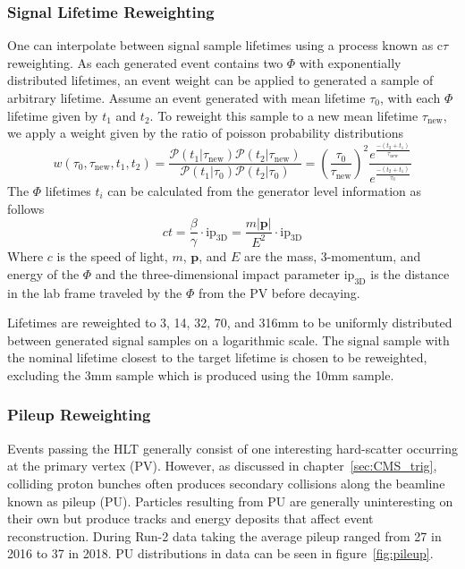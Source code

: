 \subsubsection{Signal Lifetime Reweighting} \label{sec:ana_ctau}
One can interpolate between signal sample lifetimes using a process known as c$\tau$ reweighting. As each generated event contains two $\Phi$ with exponentially distributed lifetimes, an event weight can be applied to generated a sample of arbitrary lifetime. Assume an event generated with mean lifetime $\tau_0$, with each $\Phi$ lifetime given by $t_1$ and $t_2$. To reweight this sample to a new mean lifetime $\tau_\mathrm{new}$, we apply a weight given by the ratio of poisson probability distributions
\begin{equation}\label{eq:ctreweight}
	w(\tau_0, \tau_{\mathrm{new}}, t_1, t_2) =\frac{\mathcal{P}(t_1|\tau_\mathrm{new})\mathcal{P}(t_2|\tau_\mathrm{new})}{\mathcal{P}(t_1|\tau_0)\mathcal{P}(t_2|\tau_0)}= \left(\frac{\tau_0}{\tau_{\mathrm{new}}}\right)^2 \frac{e^{\frac{-(t_2+t_1)}{\tau_{\mathrm{new}}}}}{e^{\frac{-(t_2+t_1)}{\tau_0}}}
\end{equation}
The $\Phi$ lifetimes $t_i$ can be calculated from the generator level information as follows
\begin{equation} \label{eq:lifetime}
	ct=\frac{\beta}{\gamma}\cdot\mathrm{ip}_{\mathrm{3D}}=\frac{m|\mathbf{p}|}{E^2}\cdot\mathrm{ip}_\mathrm{3D}
\end{equation}
Where $c$ is the speed of light, $m$, $\mathbf{p}$, and $E$ are the mass, 3-momentum, and energy of the $\Phi$ and the three-dimensional impact parameter $\mathrm{ip}_\mathrm{3D}$ is the distance in the lab frame traveled by the $\Phi$ from the PV before decaying. 

Lifetimes are reweighted to 3, 14, 32, 70, and 316\unit{mm} to be uniformly distributed between generated signal samples on a logarithmic scale. The signal sample with the nominal lifetime closest to the target lifetime is chosen to be reweighted, excluding the 3\unit{mm} sample which is produced using the 10\unit{mm} sample.

\subsubsection{Pileup Reweighting} \label{sec:ana_pu}
Events passing the HLT generally consist of one interesting hard-scatter occurring at the primary vertex (PV). However, as discussed in chapter~\ref{sec:CMS_trig}, colliding proton bunches often produces secondary collisions along the beamline known as pileup (PU). Particles resulting from PU are generally uninteresting on their own but produce tracks and energy deposits that affect event reconstruction. During Run-2 data taking the average pileup ranged from 27 in 2016 to 37 in 2018. PU distributions in data can be seen in figure~\ref{fig:pileup}.

